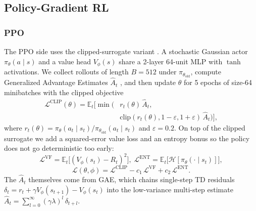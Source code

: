 \documentclass[letterpaper]{article} %
\begin{document}
\subsection{Policy-Gradient RL}

\subsubsection{PPO}
The PPO side uses the clipped-surrogate variant
\citep{schulman2017proximal}.  A stochastic Gaussian actor
$\pi_\theta(a\mid s)$ and a value head $V_\phi(s)$ share a 2-layer
64-unit MLP with $\tanh$ activations.  We collect rollouts of
length $B{=}512$ under $\pi_{\theta_{\text{old}}}$, compute
Generalized Advantage Estimates $\hat A_t$
\citep{schulman2016gae}, and then update $\theta$ for 5 epochs of
size-64 minibatches with the clipped objective
\begin{equation}
\begin{aligned}
\mathcal{L}^{\text{CLIP}}(\theta) = \mathbb{E}_t\Big[\min\!\big(
     &r_t(\theta)\,\hat A_t, \\
     &\mathrm{clip}(r_t(\theta),1{-}\varepsilon,1{+}\varepsilon)\,\hat A_t
   \big)\Big],
\end{aligned}
\label{eq:ppoclip}
\end{equation}
where
$r_t(\theta)=\pi_\theta(a_t\mid s_t)/\pi_{\theta_{\text{old}}}(a_t\mid s_t)$
and $\varepsilon{=}0.2$.  On top of the clipped surrogate we
add a squared-error value loss and an entropy bonus so the policy
does not go deterministic too early:
\begin{equation}
\mathcal{L}^{\text{VF}}=\mathbb{E}_t\!\big[(V_\phi(s_t)-R_t)^2\big],\;
\mathcal{L}^{\text{ENT}}=\mathbb{E}_t\!\big[\mathcal{H}[\pi_\theta(\cdot\mid s_t)]\big],
\label{eq:ppovfent}
\end{equation}
\begin{equation}
\mathcal{L}(\theta,\phi)
   = \mathcal{L}^{\text{CLIP}}
   - c_1\,\mathcal{L}^{\text{VF}}
   + c_2\,\mathcal{L}^{\text{ENT}}.
\label{eq:ppototal}
\end{equation}
The $\hat A_t$ themselves come from GAE, which chains single-step
TD residuals
$\delta_t = r_t + \gamma V_\phi(s_{t+1}) - V_\phi(s_t)$ into the
low-variance multi-step estimate
$\hat A_t = \sum_{l=0}^{\infty}(\gamma\lambda)^l\,\delta_{t+l}$.
\end{document}
